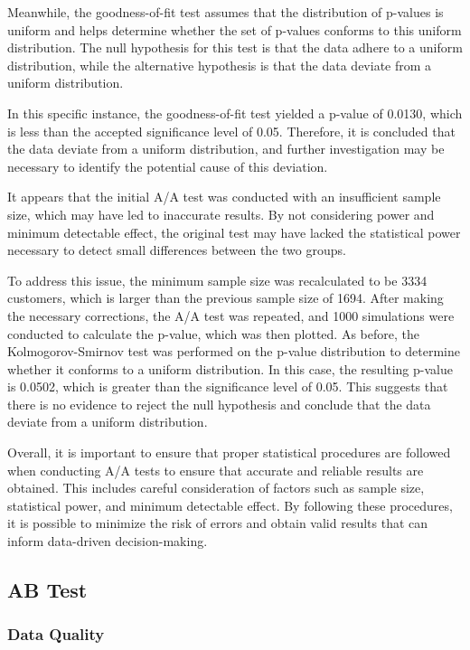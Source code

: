 \documentclass{article}
\begin{document}
Meanwhile, the goodness-of-fit test \cite{ref1} assumes that the distribution of p-values is uniform and helps determine whether the set of p-values conforms to this uniform distribution. The null hypothesis for this test is that the data adhere to a uniform distribution, while the alternative hypothesis is that the data deviate from a uniform distribution.

In this specific instance, the goodness-of-fit test yielded a p-value of 0.0130, which is less than the accepted significance level of 0.05. Therefore, it is concluded that the data deviate from a uniform distribution, and further investigation may be necessary to identify the potential cause of this deviation.

It appears that the initial A/A test was conducted with an insufficient sample size, which may have led to inaccurate results. By not considering power and minimum detectable effect, the original test may have lacked the statistical power necessary to detect small differences between the two groups.

To address this issue, the minimum sample size was recalculated to be 3334 customers, which is larger than the previous sample size of 1694. After making the necessary corrections, the A/A test was repeated, and 1000 simulations were conducted to calculate the p-value, which was then plotted. As before, the Kolmogorov-Smirnov test was performed on the p-value distribution to determine whether it conforms to a uniform distribution. In this case, the resulting p-value is 0.0502, which is greater than the significance level of 0.05. This suggests that there is no evidence to reject the null hypothesis and conclude that the data deviate from a uniform distribution.

Overall, it is important to ensure that proper statistical procedures are followed when conducting A/A tests to ensure that accurate and reliable results are obtained. This includes careful consideration of factors such as sample size, statistical power, and minimum detectable effect. By following these procedures, it is possible to minimize the risk of errors and obtain valid results that can inform data-driven decision-making.

\subsection*{AB Test} 

\subsubsection*{Data Quality} 
\end{document}
